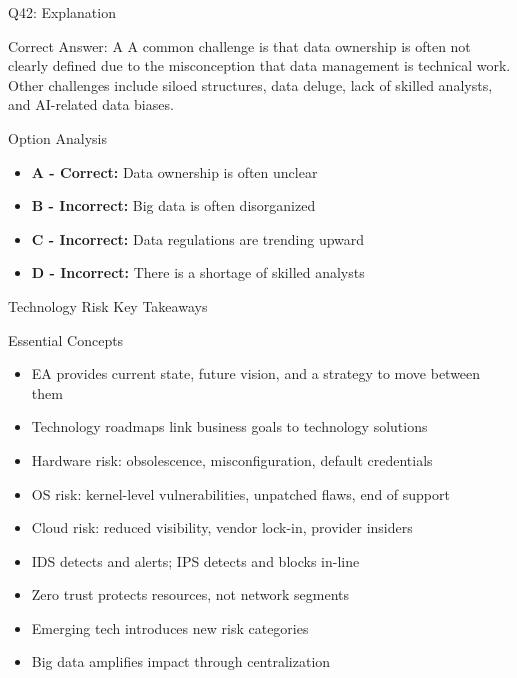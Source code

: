 \documentclass{beamer}
\begin{document}
	\begin{frame}{Q42: Explanation}
		\begin{block}{Correct Answer: A}
			A common challenge is that data ownership is often not clearly defined due to the misconception that data management is technical work. Other challenges include siloed structures, data deluge, lack of skilled analysts, and AI-related data biases.
		\end{block}
		\begin{block}{Option Analysis}
			\begin{itemize}
				\item \textbf{A - Correct:} Data ownership is often unclear
				\item \textbf{B - Incorrect:} Big data is often disorganized
				\item \textbf{C - Incorrect:} Data regulations are trending upward
				\item \textbf{D - Incorrect:} There is a shortage of skilled analysts
			\end{itemize}
		\end{block}
	\end{frame}
	
	
	\begin{frame}{Technology Risk Key Takeaways}
		\begin{block}{Essential Concepts}
			\begin{itemize}
				\item EA provides current state, future vision, and a strategy to move between them
				\item Technology roadmaps link business goals to technology solutions
				\item Hardware risk: obsolescence, misconfiguration, default credentials
				\item OS risk: kernel-level vulnerabilities, unpatched flaws, end of support
				\item Cloud risk: reduced visibility, vendor lock-in, provider insiders
				\item IDS detects and alerts; IPS detects and blocks in-line
				\item Zero trust protects resources, not network segments
				\item Emerging tech introduces new risk categories
				\item Big data amplifies impact through centralization
			\end{itemize}
		\end{block}
	\end{frame}
	
\end{document}

